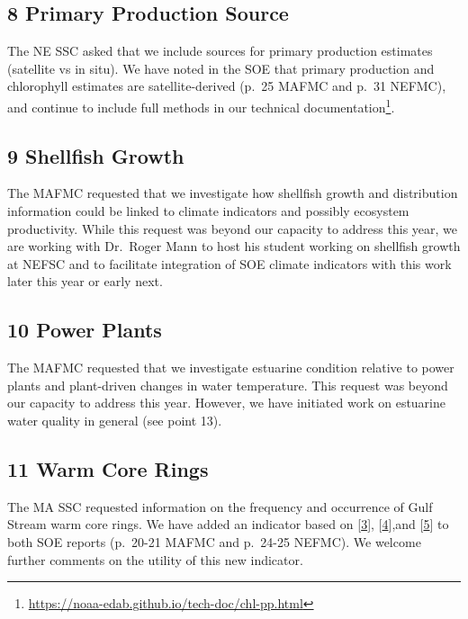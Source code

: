 \documentclass[
  10pt,
]{article}
\begin{document}
\hypertarget{primary-production-source}{%
\subsection{8 Primary Production
Source}\label{primary-production-source}}

The NE SSC asked that we include sources for primary production
estimates (satellite vs in situ). We have noted in the SOE that primary
production and chlorophyll estimates are satellite-derived (p.~25 MAFMC
and p.~31 NEFMC), and continue to include full methods in our technical
documentation\footnote{\url{https://noaa-edab.github.io/tech-doc/chl-pp.html}}.

\hypertarget{shellfish-growth}{%
\subsection{9 Shellfish Growth}\label{shellfish-growth}}

The MAFMC requested that we investigate how shellfish growth and
distribution information could be linked to climate indicators and
possibly ecosystem productivity. While this request was beyond our
capacity to address this year, we are working with Dr.~Roger Mann to
host his student working on shellfish growth at NEFSC and to facilitate
integration of SOE climate indicators with this work later this year or
early next.

\hypertarget{power-plants}{%
\subsection{10 Power Plants}\label{power-plants}}

The MAFMC requested that we investigate estuarine condition relative to
power plants and plant-driven changes in water temperature. This request
was beyond our capacity to address this year. However, we have initiated
work on estuarine water quality in general (see point 13).

\hypertarget{warm-core-rings}{%
\subsection{11 Warm Core Rings}\label{warm-core-rings}}

The MA SSC requested information on the frequency and occurrence of Gulf
Stream warm core rings. We have added an indicator based on
{[}\protect\hyperlink{ref-andres_recent_2016}{3}{]},
{[}\protect\hyperlink{ref-gawarkiewicz_changing_2018}{4}{]},and
{[}\protect\hyperlink{ref-gangopadhyay_observed_2019}{5}{]} to both SOE
reports (p.~20-21 MAFMC and p.~24-25 NEFMC). We welcome further comments
on the utility of this new indicator.
\end{document}
